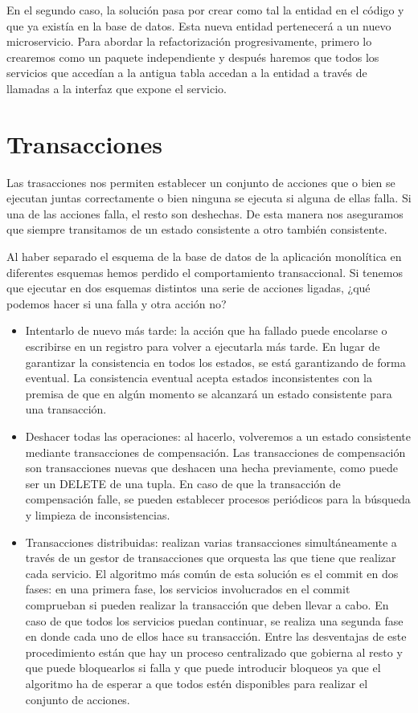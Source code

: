 \documentclass[11pt,a4paper]{article}
\begin{document}
En el segundo caso, la solución pasa por crear como tal la entidad en el código y que ya existía en la base de datos. Esta nueva entidad pertenecerá a un nuevo microservicio. Para abordar la refactorización progresivamente, primero lo crearemos como un paquete independiente y después haremos que todos los servicios que accedían a la antigua tabla accedan a la entidad a través de llamadas a la interfaz que expone el servicio.

\section{Transacciones}

Las trasacciones nos permiten establecer un conjunto de acciones que o bien se ejecutan juntas correctamente o bien ninguna se ejecuta si alguna de ellas falla. Si una de las acciones falla, el resto son deshechas. De esta manera nos aseguramos que siempre transitamos de un estado consistente a otro también consistente.

Al haber separado el esquema de la base de datos de la aplicación monolítica en diferentes esquemas hemos perdido el comportamiento transaccional. Si tenemos que ejecutar en dos esquemas distintos una serie de acciones ligadas, ¿qué podemos hacer si una falla y otra acción no?

\begin{itemize}

\item Intentarlo de nuevo más tarde: la acción que ha fallado puede encolarse o escribirse en un registro para volver a ejecutarla más tarde. En lugar de garantizar la consistencia en todos los estados, se está garantizando de forma eventual. La consistencia eventual acepta estados inconsistentes  con la premisa de que en algún momento se alcanzará un estado consistente para una transacción.

\item Deshacer todas las operaciones: al hacerlo, volveremos a un estado consistente mediante transacciones de compensación. Las transacciones de compensación son transacciones nuevas que deshacen una hecha previamente, como puede ser un DELETE de una tupla. En caso de que la transacción de compensación falle, se pueden establecer procesos periódicos para la búsqueda y limpieza de inconsistencias.

\item Transacciones distribuidas: realizan varias transacciones simultáneamente a través de un gestor de transacciones que orquesta las que tiene que realizar cada servicio. El algoritmo más común de esta solución es el commit en dos fases: en una primera fase, los servicios involucrados en el commit comprueban si pueden realizar la transacción que deben llevar a cabo. En caso de que todos los servicios puedan continuar, se realiza una segunda fase en donde cada uno de ellos hace su transacción. Entre las desventajas de este procedimiento están que hay un proceso centralizado que gobierna al resto y que puede bloquearlos si falla y que puede introducir bloqueos ya que el algoritmo ha de esperar a que todos estén disponibles para realizar el conjunto de acciones.

\end{itemize}
\end{document}

